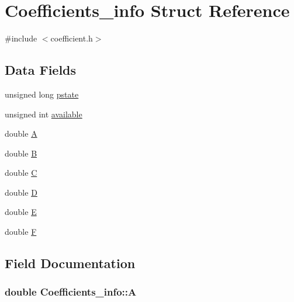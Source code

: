 \hypertarget{structCoefficients__info}{}\section{Coefficients\+\_\+info Struct Reference}
\label{structCoefficients__info}


{\ttfamily \#include $<$coefficient.\+h$>$}

\subsection*{Data Fields}
\begin{DoxyCompactItemize}
\item 
unsigned long \hyperlink{structCoefficients__info_a8bb777249c04aa3a0e6935bd4d9949d5}{pstate}
\item 
unsigned int \hyperlink{structCoefficients__info_a8ac8e57ab77710560da7210dc8db6849}{available}
\item 
double \hyperlink{structCoefficients__info_a82db8b77cc48668735e3b12094f0cc08}{A}
\item 
double \hyperlink{structCoefficients__info_a40c20fea5eb4b16c5e9984b166bf0bc7}{B}
\item 
double \hyperlink{structCoefficients__info_acf2369415bc4f61d032adcfbe860514d}{C}
\item 
double \hyperlink{structCoefficients__info_afd2e3658dc200331f609cd64827c5a42}{D}
\item 
double \hyperlink{structCoefficients__info_ad9c906e1de18c1ccb17cdf57e1aa73c4}{E}
\item 
double \hyperlink{structCoefficients__info_af3ccffc2c82048102f09ee41cd8ed30c}{F}
\end{DoxyCompactItemize}


\subsection{Field Documentation}
\subsubsection[{\texorpdfstring{A}{A}}]{\setlength{\rightskip}{0pt plus 5cm}double Coefficients\+\_\+info\+::A}\hypertarget{structCoefficients__info_a82db8b77cc48668735e3b12094f0cc08}{}\label{structCoefficients__info_a82db8b77cc48668735e3b12094f0cc08}

